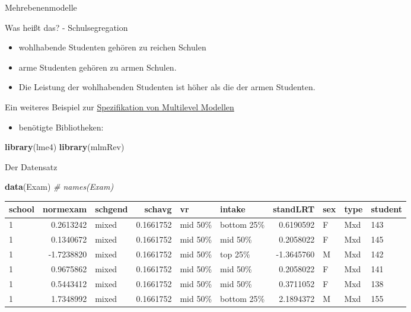 \documentclass[ignorenonframetext,]{beamer}
\newenvironment{Shaded}{}{}
\newcommand{\KeywordTok}[1]{\textcolor[rgb]{0.00,0.44,0.13}{\textbf{{#1}}}}
\newcommand{\CommentTok}[1]{\textcolor[rgb]{0.38,0.63,0.69}{\textit{{#1}}}}
\newcommand{\NormalTok}[1]{{#1}}
\providecommand{\tightlist}{%
\setlength{\itemsep}{0pt}\setlength{\parskip}{0pt}}
\begin{document}
\begin{frame}[fragile]{Mehrebenenmodelle}
\begin{block}{Was heißt das? - Schulsegregation}

\begin{itemize}
\item
  wohlhabende Studenten gehören zu reichen Schulen
\item
  arme Studenten gehören zu armen Schulen.
\item
  Die Leistung der wohlhabenden Studenten ist höher als die der armen
  Studenten.
\end{itemize}

\end{block}

\begin{block}{Ein weiteres Beispiel zur
\href{http://www.rensenieuwenhuis.nl/r-sessions-16-multilevel-model-specification-lme4/}{Spezifikation
von Multilevel Modellen}}

\begin{itemize}
\tightlist
\item
  benötigte Bibliotheken:
\end{itemize}

\begin{Shaded}
\begin{Highlighting}[]
\KeywordTok{library}\NormalTok{(lme4)}
\KeywordTok{library}\NormalTok{(mlmRev)}
\end{Highlighting}
\end{Shaded}

\end{block}

\begin{block}{Der Datensatz}

\begin{Shaded}
\begin{Highlighting}[]
\KeywordTok{data}\NormalTok{(Exam)}
\CommentTok{# names(Exam)}
\end{Highlighting}
\end{Shaded}

\begin{longtable}[]{@{}lrlrllrlll@{}}
\toprule
school & normexam & schgend & schavg & vr & intake & standLRT & sex &
type & student\tabularnewline
\midrule
\endhead
1 & 0.2613242 & mixed & 0.1661752 & mid 50\% & bottom 25\% & 0.6190592 &
F & Mxd & 143\tabularnewline
1 & 0.1340672 & mixed & 0.1661752 & mid 50\% & mid 50\% & 0.2058022 & F
& Mxd & 145\tabularnewline
1 & -1.7238820 & mixed & 0.1661752 & mid 50\% & top 25\% & -1.3645760 &
M & Mxd & 142\tabularnewline
1 & 0.9675862 & mixed & 0.1661752 & mid 50\% & mid 50\% & 0.2058022 & F
& Mxd & 141\tabularnewline
1 & 0.5443412 & mixed & 0.1661752 & mid 50\% & mid 50\% & 0.3711052 & F
& Mxd & 138\tabularnewline
1 & 1.7348992 & mixed & 0.1661752 & mid 50\% & bottom 25\% & 2.1894372 &
M & Mxd & 155\tabularnewline
\bottomrule
\end{longtable}


\end{block}
\end{frame}
\end{document}
